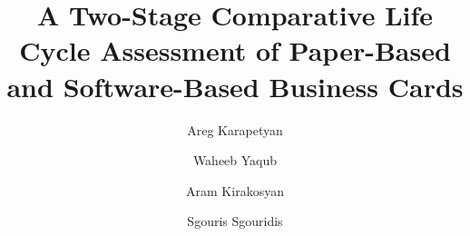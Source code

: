 \documentclass[3p,times,procedia]{elsarticle}
\begin{document}
\begin{frontmatter}




\title{A Two-Stage Comparative Life Cycle Assessment of Paper-Based and Software-Based Business Cards}



\author[a]{Areg Karapetyan }
\author[a]{Waheeb Yaqub }
\author[a]{Aram Kirakosyan}
\author[b]{Sgouris Sgouridis}

\address[a]{Department of Electrical Engineering and Computer Science, Masdar Institute of Science and Technology, Abu Dhabi, UAE}
\address[b]{Engineering Systems and Management Department, Masdar Institute of Science and Technology, Abu Dhabi, UAE}




\end{frontmatter}
\end{document}
